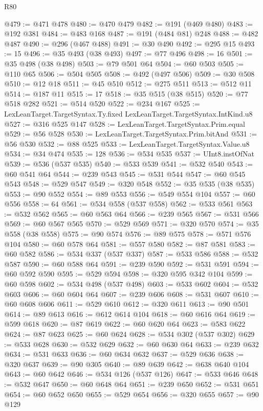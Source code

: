 \begin{lexlean}{R80}
\begin{coremodule}
@479 := @471 @478
@480 := @470 @479
@482 := @191 (@469 @480)
@483 := @192 @381
@484 := @483 @168
@487 := @191 (@484 @81) @248
@488 := @482 @487
@490 := @296 (@467 @488)
@491 := @30 @490
@492 := @295 @15
@493 := 15
@496 := @35 @493 (@38 @493)
@497 := @77 @496
@498 := 16
@501 := @35 @498 (@38 @498)
@503 := @79 @501 @64
@504 := @60 @503
@505 := @110 @65
@506 := @504 @505
@508 := @492 (@497 @506)
@509 := @30 @508
@510 := @12 @18
@511 := @45 @510
@512 := @275 @511
@513 := @512 @11
@514 := @187 @11
@515 := 17
@518 := @35 @515 (@38 @515)
@520 := @77 @518 @282
@521 := @514 @520
@522 := @234 @167
@525 := LexLeanTarget.TargetSyntax.Ty.fixed LexLeanTarget.TargetSyntax.IntKind.u8
@527 := @316 @525 @147
@528 := LexLeanTarget.TargetSyntax.Prim.equal
@529 := @56 @528
@530 := LexLeanTarget.TargetSyntax.Prim.bitAnd
@531 := @56 @530
@532 := @88 @525
@533 := LexLeanTarget.TargetSyntax.Value.u8
@534 := @34 @474
@535 := 128
@536 := @534 @535
@537 := UInt8.instOfNat
@539 := @536 (@537 @535)
@540 := @533 @539
@541 := @532 @540
@543 := @60 @541 @64
@544 := @239 @543
@545 := @531 @544
@547 := @60 @545 @543
@548 := @529 @547
@549 := @320 @548
@552 := @35 @535 (@38 @535)
@553 := @90 @552
@554 := @89 @553
@556 := @549 @554 @104
@557 := @60 @556
@558 := 64
@561 := @534 @558 (@537 @558)
@562 := @533 @561
@563 := @532 @562
@565 := @60 @563 @64
@566 := @239 @565
@567 := @531 @566
@569 := @60 @567 @565
@570 := @529 @569
@571 := @320 @570
@574 := @35 @558 (@38 @558)
@575 := @90 @574
@576 := @89 @575
@578 := @571 @576 @104
@580 := @60 @578 @64
@581 := @557 @580
@582 := @87 @581
@583 := @60 @582
@586 := @534 @337 (@537 @337)
@587 := @533 @586
@588 := @532 @587
@590 := @60 @588 @64
@591 := @239 @590
@592 := @531 @591
@594 := @60 @592 @590
@595 := @529 @594
@598 := @320 @595 @342 @104
@599 := @60 @598
@602 := @534 @498 (@537 @498)
@603 := @533 @602
@604 := @532 @603
@606 := @60 @604 @64
@607 := @239 @606
@608 := @531 @607
@610 := @60 @608 @606
@611 := @529 @610
@612 := @320 @611
@613 := @90 @501
@614 := @89 @613
@616 := @612 @614 @104
@618 := @60 @616 @64
@619 := @599 @618
@620 := @87 @619
@622 := @60 @620 @64
@623 := @583 @622
@624 := @87 @623
@625 := @60 @624
@628 := @534 @302 (@537 @302)
@629 := @533 @628
@630 := @532 @629
@632 := @60 @630 @64
@633 := @239 @632
@634 := @531 @633
@636 := @60 @634 @632
@637 := @529 @636
@638 := @320 @637
@639 := @90 @305
@640 := @89 @639
@642 := @638 @640 @104
@643 := @60 @642
@646 := @534 @126 (@537 @126)
@647 := @533 @646
@648 := @532 @647
@650 := @60 @648 @64
@651 := @239 @650
@652 := @531 @651
@654 := @60 @652 @650
@655 := @529 @654
@656 := @320 @655
@657 := @90 @129

\end{coremodule}
\end{lexlean}
